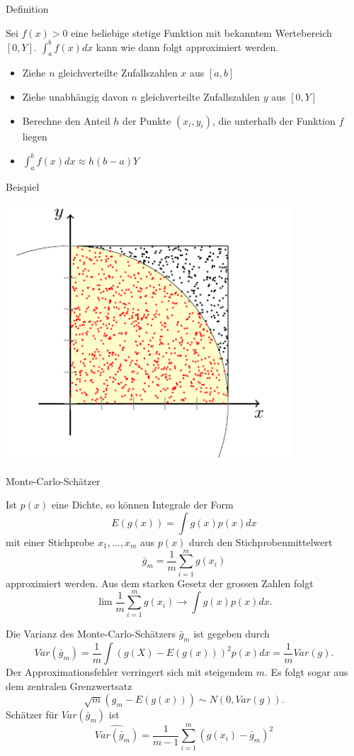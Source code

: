 \documentclass[ignorenonframetext,]{beamer}
\begin{document}
\begin{frame}{Definition}

Sei \(f(x)>0\) eine beliebige stetige Funktion mit bekanntem
Wertebereich \([0,Y]\). \(\int_a^b f(x) dx\) kann wie dann folgt
approximiert werden.

\begin{itemize}
\item Ziehe $n$ gleichverteilte Zufallszahlen $x$ aus $[a,b]$ 
\item Ziehe unabhängig davon $n$ gleichverteilte Zufallszahlen $y$ aus $[0,Y]$
\item Berechne den Anteil $h$ der Punkte $(x_i,y_i)$, die unterhalb der Funktion $f$ liegen 
\item $\int_a^b f(x) dx \approx h(b-a)Y$ 
\end{itemize}

\end{frame}

\begin{frame}{Beispiel}

\includegraphics[scale=.4]{pics/mc-int.png}

\end{frame}

\begin{frame}[allowframebreaks]{Monte-Carlo-Schätzer}

Ist \(p(x)\) eine Dichte, so können Integrale der Form\[
E(g(x))=\int g(x)p(x) dx
\] mit einer Stichprobe \(x_1,\ldots,x_m\) aus \(p(x)\) durch den
Stichprobenmittelwert \[
\bar{g}_m=\frac{1}{m}\sum_{i=1}^mg\left(x_i\right)
\] approximiert werden. Aus dem starken Gesetz der grossen Zahlen folgt
\[
\lim \frac{1}{m} \sum_{i=1}^m g(x_i)\to \int g(x)p(x)dx.
\]

Die Varianz des Monte-Carlo-Schätzers \(\bar{g}_m\) ist gegeben durch \[
Var(\bar{g}_m)=\frac{1}{m}\int\left(g(X)-E(g(x))\right)^2 p(x)dx=\frac{1}{m}Var(g).
\] Der Approximationsfehler verringert sich mit steigendem \(m\). Es
folgt sogar aus dem zentralen Grenzwertsatz \[
\sqrt{m}\left(g_m-E(g(x))\right)\sim N(0,Var(g)).
\] Schätzer für \(Var(\bar{g}_m)\) ist
\[ \widehat{Var(\bar{g}_m)}=\frac{1}{m-1}\sum_{i=1}^m
\left(g(x_i)-\bar{g}_m\right)^2
\]

\end{frame}
\end{document}
